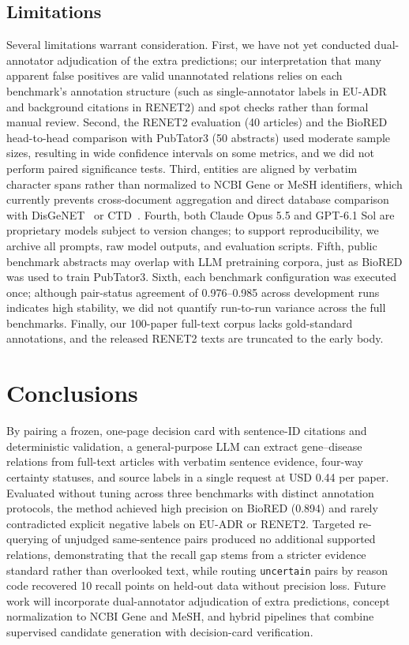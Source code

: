 \documentclass[preprint,10pt,letterpaper]{elsarticle}
\newcommand{\st}[1]{\texttt{#1}}             %
\begin{document}
\subsection{Limitations}
Several limitations warrant consideration. First, we have not yet conducted dual-annotator adjudication of the extra predictions; our interpretation that many apparent false positives are valid unannotated relations relies on each benchmark's annotation structure (such as single-annotator labels in EU-ADR and background citations in RENET2) and spot checks rather than formal manual review. Second, the RENET2 evaluation (40 articles) and the BioRED head-to-head comparison with PubTator3 (50 abstracts) used moderate sample sizes, resulting in wide confidence intervals on some metrics, and we did not perform paired significance tests. Third, entities are aligned by verbatim character spans rather than normalized to NCBI Gene or MeSH identifiers, which currently prevents cross-document aggregation and direct database comparison with DisGeNET~\cite{pinero2020disgenet} or CTD~\cite{davis2023ctd}. Fourth, both Claude Opus 5.5 and GPT-6.1 Sol are proprietary models subject to version changes; to support reproducibility, we archive all prompts, raw model outputs, and evaluation scripts. Fifth, public benchmark abstracts may overlap with LLM pretraining corpora, just as BioRED was used to train PubTator3. Sixth, each benchmark configuration was executed once; although pair-status agreement of 0.976--0.985 across development runs indicates high stability, we did not quantify run-to-run variance across the full benchmarks. Finally, our 100-paper full-text corpus lacks gold-standard annotations, and the released RENET2 texts are truncated to the early body.

\section{Conclusions}
By pairing a frozen, one-page decision card with sentence-ID citations and deterministic validation, a general-purpose LLM can extract gene--disease relations from full-text articles with verbatim sentence evidence, four-way certainty statuses, and source labels in a single request at USD 0.44 per paper. Evaluated without tuning across three benchmarks with distinct annotation protocols, the method achieved high precision on BioRED (0.894) and rarely contradicted explicit negative labels on EU-ADR or RENET2. Targeted re-querying of unjudged same-sentence pairs produced no additional supported relations, demonstrating that the recall gap stems from a stricter evidence standard rather than overlooked text, while routing \st{uncertain} pairs by reason code recovered 10 recall points on held-out data without precision loss. Future work will incorporate dual-annotator adjudication of extra predictions, concept normalization to NCBI Gene and MeSH, and hybrid pipelines that combine supervised candidate generation with decision-card verification.
\end{document}
